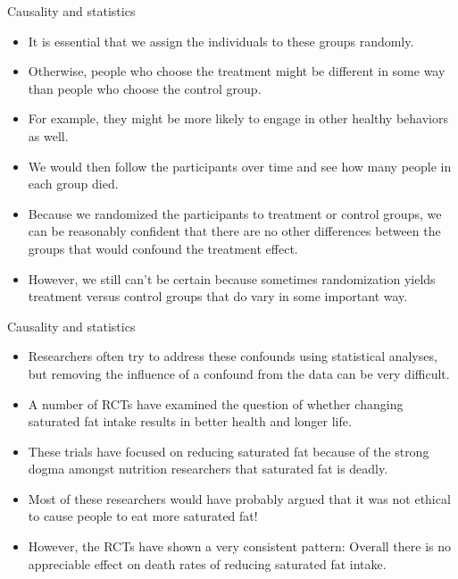 \documentclass[handout]{beamer}
\begin{document}
\begin{frame}{Causality and statistics}

\scriptsize{
\begin{itemize}
\item It is essential that we assign the individuals to these groups randomly. 
\item Otherwise, people who choose the treatment might be different in some way than people who choose the control group.
\item For example, they might be more likely to engage in other healthy behaviors as well. 
\item We would then follow the participants over time and see how many people in each group died. 
\item Because we randomized the participants to treatment or control groups, we can be reasonably confident that there are no other differences between the groups that would confound the treatment effect.
\item However, we still can’t be certain because sometimes randomization yields treatment versus control groups that do vary in some important way.
\end{itemize}

}
 
\end{frame}


\begin{frame}{Causality and statistics}

\scriptsize{
\begin{itemize}
\item Researchers often try to address these confounds using statistical analyses, but removing the influence of a confound from the data can be very difficult.
\item A number of RCTs have examined the question of whether changing saturated fat intake results in better health and longer life. 
\item These trials have focused on reducing saturated fat because of the strong dogma amongst nutrition researchers that saturated fat is deadly.
\item Most of these researchers would have probably argued that it was not ethical to cause people to eat more saturated fat! \item However, the RCTs have shown a very consistent pattern: Overall there is no appreciable effect on death rates of reducing saturated fat intake.
\end{itemize}

}
 
\end{frame}
\end{document}
